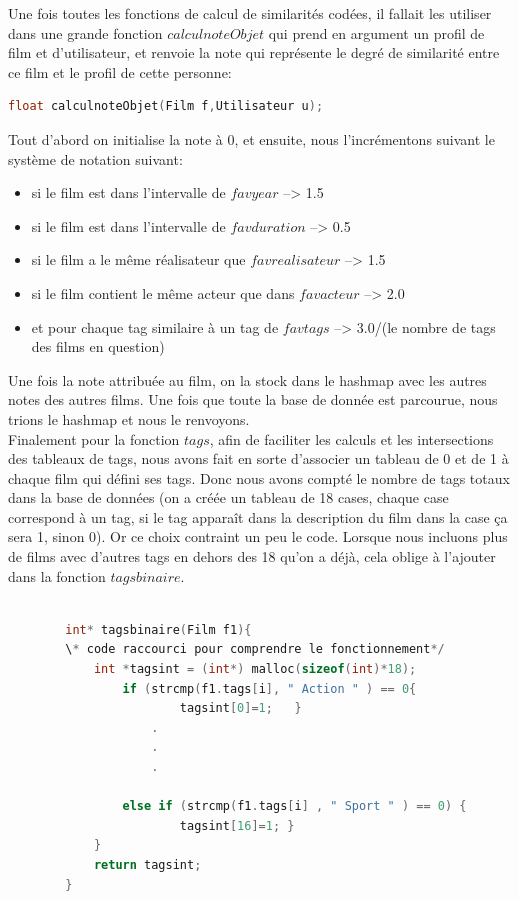 \documentclass[light]{ceri}
\begin{document}
\indent Une fois toutes les fonctions de calcul de similarités codées, il fallait les utiliser dans une grande fonction $calculnoteObjet$ qui prend en argument un profil de film et d'utilisateur, et renvoie la note qui représente le degré de similarité entre ce film et le profil de cette personne: 
     \begin{lstlisting}[language=c]
        float calculnoteObjet(Film f,Utilisateur u);
    \end{lstlisting}
Tout d'abord on initialise la note à 0, et ensuite, nous l'incrémentons suivant le système de notation suivant: 
    \begin{itemize}
        \item si le film est dans l'intervalle de $favyear$ --> 1.5
        \item si le film est dans l'intervalle de $favduration$ --> 0.5
        \item si le film a le même réalisateur que $favrealisateur$ --> 1.5
        \item si le film contient le même acteur que dans $favacteur$ --> 2.0
        \item et pour chaque tag similaire à un tag de $favtags$ --> 3.0/(le nombre de tags des films en question)
    \end{itemize}

Une fois la note attribuée au film, on la stock dans le hashmap avec les autres notes des autres films. Une fois que toute la base de donnée est parcourue, nous trions le hashmap et nous le renvoyons.\\
Finalement pour la fonction $tags$, afin de faciliter les calculs et les intersections des tableaux de tags, nous avons fait en sorte d'associer un tableau de 0 et de 1 à chaque film qui défini ses tags. Donc nous avons compté le nombre de tags totaux dans la base de données (on a créée un tableau de 18 cases, chaque case correspond à un tag, si le tag apparaît dans la description du film dans la case ça sera 1, sinon 0). Or ce choix contraint un peu le code. Lorsque nous incluons plus de films avec d'autres tags en dehors des 18 qu'on a déjà, cela oblige à l'ajouter dans la fonction $tagsbinaire$.
         \begin{lstlisting}[language=c]
                    
        int* tagsbinaire(Film f1){
        \* code raccourci pour comprendre le fonctionnement*/
        	int *tagsint = (int*) malloc(sizeof(int)*18);
        		if (strcmp(f1.tags[i], " Action " ) == 0{ 
        				tagsint[0]=1;	}
                    .
                    .
                    .
                    
        		else if (strcmp(f1.tags[i] , " Sport " ) == 0) {
        				tagsint[16]=1; }
        	}
        	return tagsint;
        }
    \end{lstlisting}
\end{document}
